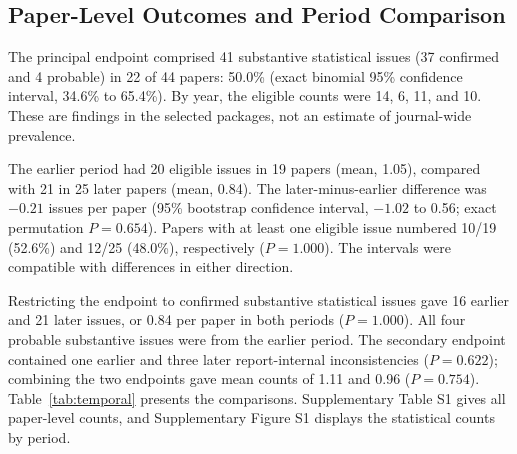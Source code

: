 

\subsection{Paper-Level Outcomes and Period Comparison}

The principal endpoint comprised 41 substantive statistical issues (37 confirmed and 4 probable) in 22 of 44 papers: 50.0\% (exact binomial 95\% confidence interval, 34.6\% to 65.4\%). By year, the eligible counts were 14, 6, 11, and 10. These are findings in the selected packages, not an estimate of journal-wide prevalence.

The earlier period had 20 eligible issues in 19 papers (mean, 1.05), compared with 21 in 25 later papers (mean, 0.84). The later-minus-earlier difference was $-0.21$ issues per paper (95\% bootstrap confidence interval, $-1.02$ to 0.56; exact permutation $P=0.654$). Papers with at least one eligible issue numbered 10/19 (52.6\%) and 12/25 (48.0\%), respectively ($P=1.000$). The intervals were compatible with differences in either direction.

Restricting the endpoint to confirmed substantive statistical issues gave 16 earlier and 21 later issues, or 0.84 per paper in both periods ($P=1.000$). All four probable substantive issues were from the earlier period. The secondary endpoint contained one earlier and three later report-internal inconsistencies ($P=0.622$); combining the two endpoints gave mean counts of 1.11 and 0.96 ($P=0.754$). Table~\ref{tab:temporal} presents the comparisons. Supplementary Table S1 gives all paper-level counts, and Supplementary Figure S1 displays the statistical counts by period.


